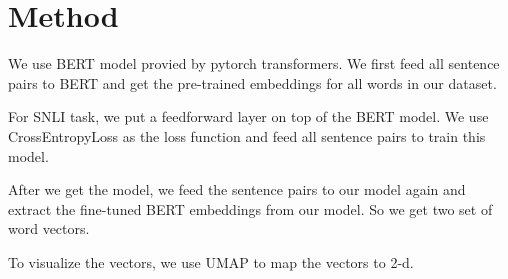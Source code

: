 \section{Method}

We use BERT model provied by pytorch transformers. We first feed all sentence pairs to BERT and get the pre-trained  embeddings for all words in our dataset. 

For SNLI task, we put a feedforward layer on top of the BERT model. We use CrossEntropyLoss as the loss function and feed all sentence pairs to train this model.

After we get the model, we feed the sentence pairs to our model again and extract the fine-tuned BERT embeddings from our model. So we get two set of word vectors.

To visualize the vectors, we use UMAP to map the vectors to 2-d.